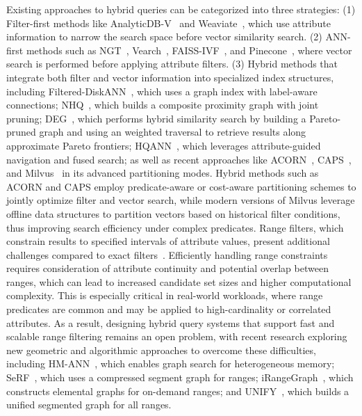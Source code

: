 \documentclass[numbers,sort]{article}
\begin{document}
Existing approaches to hybrid queries can be categorized into three strategies: (1) Filter-first methods like AnalyticDB-V~\cite{wei2020analyticdb} and Weaviate~\cite{taipalus-2024}, which use attribute information to narrow the search space before vector similarity search. (2) ANN-first methods such as NGT~\cite{yahooNGT}, Vearch~\cite{vearch}, FAISS-IVF~\cite{douze2024faiss}, and Pinecone~\cite{pinecone}, where vector search is performed before applying attribute filters. (3) Hybrid methods that integrate both filter and vector information into specialized index structures, including Filtered-DiskANN~\cite{gollapudi2023filtered}, which uses a graph index with label-aware connections; NHQ~\cite{wang2023efficient}, which builds a composite proximity graph with joint pruning; DEG~\cite{deg}, which performs hybrid similarity search by building a Pareto-pruned graph and using an weighted traversal to retrieve results along approximate Pareto frontiers; HQANN~\cite{hqann}, which leverages attribute-guided navigation and fused search; as well as recent approaches like ACORN~\cite{patel2024acorn}, CAPS~\cite{gupta2023caps}, and Milvus~\cite{wang2021milvus} in its advanced partitioning modes. Hybrid methods such as ACORN and CAPS employ predicate-aware or cost-aware partitioning schemes to jointly optimize filter and vector search, while modern versions of Milvus leverage offline data structures to partition vectors based on historical filter conditions, thus improving search efficiency under complex predicates. Range filters, which constrain results to specified intervals of attribute values, present additional challenges compared to exact filters~\cite{pan2024survey}. Efficiently handling range constraints requires consideration of attribute continuity and potential overlap between ranges, which can lead to increased candidate set sizes and higher computational complexity. This is especially critical in real-world workloads, where range predicates are common and may be applied to high-cardinality or correlated attributes. As a result, designing hybrid query systems that support fast and scalable range filtering remains an open problem, with recent research exploring new geometric and algorithmic approaches to overcome these difficulties, including HM-ANN~\cite{ren2020hm}, which enables graph search for heterogeneous memory; SeRF~\cite{zuo2024serf}, which uses a compressed segment graph for ranges; iRangeGraph~\cite{xu2025iranggraph}, which constructs elemental graphs for on-demand ranges; and UNIFY~\cite{liang2024unify}, which builds a unified segmented graph for all ranges.
\end{document}
